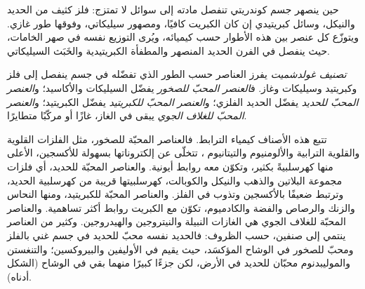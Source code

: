 حين ينصهر جسم كوندريتي تنفصل مادته إلى سوائل لا تمتزج: فلز
كثيف من الحديد والنيكل، وسائل كبريتيدي إن كان الكبريت كافيًا،
ومصهور سيليكاتي، وفوقها طور غازي. ويتوزّع كل عنصر بين
هذه الأطوار حسب كيميائه، ويُرى التوزيع نفسه في
صهر الخامات، حيث ينفصل في الفرن الحديد المنصهر والمطفأة الكبريتيدية والخَبَث
السيليكاتي.

\begin{definition}
\label{def:b2:elements-in-the-earth:goldschmidt}
\emph{تصنيف غولدشميت} يفرز
العناصر حسب الطور الذي تفضّله في جسم ينفصل إلى فلز
وكبريتيد وسيليكات وغاز. ف\emph{العنصر المحبّ للصخور}
يفضّل السيليكات والأكاسيد؛ و\emph{العنصر المحبّ للحديد}
يفضّل الحديد الفلزي؛ و\emph{العنصر المحبّ
للكبريتيد} يفضّل الكبريتيد؛ و\emph{العنصر المحبّ
للغلاف الجوي} يبقى في الغاز، غازًا أو مركّبًا
متطايرًا.
\end{definition}

تتبع هذه الأصناف كيمياء الترابط. فالعناصر المحبّة للصخور، مثل الفلزات
القلوية والقلوية الترابية والألومنيوم والتيتانيوم ، تتخلّى
عن إلكتروناتها بسهولة للأكسجين، الأعلى منها كهرسلبيةً بكثير،
وتكوّن معه روابط أيونية. والعناصر المحبّة للحديد، أي فلزات مجموعة البلاتين والذهب
والنيكل والكوبالت، كهرسلبيتها قريبة من كهرسلبية الحديد، وترتبط ضعيفًا
بالأكسجين وتذوب في الفلز. والعناصر المحبّة للكبريتيد، ومنها النحاس والزنك والرصاص
والفضة والكادميوم، تكوّن مع الكبريت روابط أكثر تساهمية.
والعناصر المحبّة للغلاف الجوي هي الغازات النبيلة والنيتروجين والهيدروجين. وكثير من
العناصر ينتمي إلى صنفين، حسب الظروف: فالحديد نفسه
محبّ للحديد في جسم غني بالفلز ومحبّ للصخور في الوشاح المؤكسَد، حيث
يقيم في الأوليفين والبيروكسين؛ والتنغستن والموليبدنوم محبّان للحديد في
الأرض، لكن جزءًا كبيرًا منهما بقي في الوشاح (الشكل أدناه).

